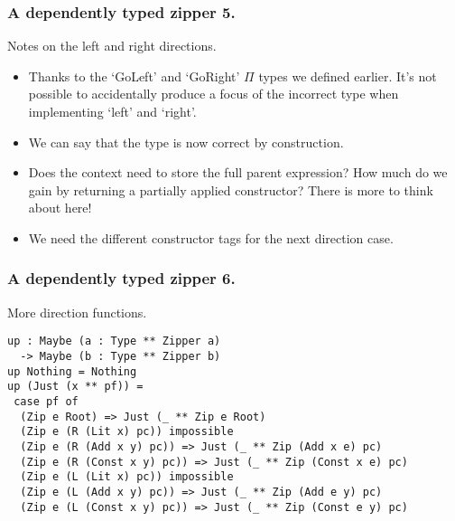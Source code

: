 \documentclass{beamer}
\begin{document}
\begin{frame}[fragile]
  \frametitle{A dependently typed zipper 5.}
  \begin{block}{Notes on the left and right directions.}
    \begin{itemize}
      \item Thanks to the `GoLeft' and `GoRight' $\Pi$ types 
        we defined earlier. It's not possible to accidentally
        produce a focus of the incorrect type when implementing
        `left' and `right'.
      \item We can say that the type is now correct by construction.
      \item Does the context need to store the full parent 
        expression? How much do we gain by returning a partially
        applied constructor? There is more to think about here!
      \item We need the different constructor tags for the next
        direction case.
    \end{itemize}
  \end{block}
\end{frame}

\begin{frame}[fragile]
  \frametitle{A dependently typed zipper 6.}
  \begin{block}{More direction functions.}
    \begin{verbatim}
up : Maybe (a : Type ** Zipper a) 
  -> Maybe (b : Type ** Zipper b)
up Nothing = Nothing
up (Just (x ** pf)) =
 case pf of
  (Zip e Root) => Just (_ ** Zip e Root)
  (Zip e (R (Lit x) pc)) impossible
  (Zip e (R (Add x y) pc)) => Just (_ ** Zip (Add x e) pc)
  (Zip e (R (Const x y) pc)) => Just (_ ** Zip (Const x e) pc)
  (Zip e (L (Lit x) pc)) impossible
  (Zip e (L (Add x y) pc)) => Just (_ ** Zip (Add e y) pc)
  (Zip e (L (Const x y) pc)) => Just (_ ** Zip (Const e y) pc)
    \end{verbatim}
  \end{block}
\end{frame}
\end{document}
